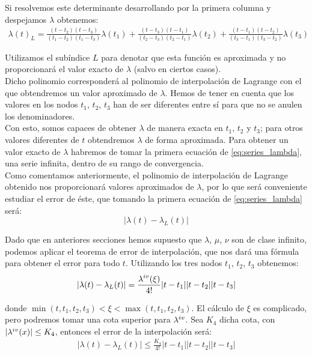 \documentclass[11pt]{book}
\newcommand\ddfrac[2]{\frac{\displaystyle #1}{\displaystyle #2}}
\begin{document}
Si resolvemos este determinante desarrollando por la primera columna y despejamos $\lambda$ obtenemos:
\begin{align}
\lambda(t)_L=
\frac{(t-t_2)(t-t_3)}{(t_1-t_2)(t_1-t_3)}\lambda(t_1)
+\frac{(t-t_3)(t-t_1)}{(t_2-t_3)(t_2-t_1)}\lambda(t_2)
+\frac{(t-t_1)(t-t_2)}{(t_3-t_1)(t_3-t_2)}\lambda(t_3)
\label{eq:lambda_value}
\end{align}

Utilizamos el subíndice $L$ para denotar que esta función es aproximada y no proporcionará el valor exacto de $\lambda$ (salvo en ciertos casos).\\

Dicho polinomio corresponderá al polinomio de interpolación de Lagrange con el que obtendremos un valor aproximado de $\lambda$. Hemos de tener en cuenta que los valores en los nodos $t_1$, $t_2$, $t_3$ han de ser diferentes entre sí para que no se anulen los denominadores.\\

Con esto, somos capaces de obtener $\lambda$ de manera exacta en $t_1$, $t_2$ y $t_3$; para otros valores diferentes de $t$ obtendremos $\lambda$ de forma aproximada. Para obtener un valor exacto de $\lambda$ habremos de tomar la primera ecuación de \eqref{eq:series_lambda}, una serie infinita, dentro de su rango de convergencia.\\

Como comentamos anteriormente, el polinomio de interpolación de Lagrange obtenido nos proporcionará valores aproximados de $\lambda$, por lo que será conveniente estudiar el error de éste, que tomando la primera ecuación de \eqref{eq:series_lambda} será:
\[
|\lambda(t)-\lambda_L(t)|
\]

Dado que en anteriores secciones hemos supuesto que $\lambda$, $\mu$, $\nu$ son de clase infinito, podemos aplicar el teorema de error de interpolación, que nos dará una fórmula para obtener el error para todo $t$. Utilizando los tres nodos $t_1$, $t_2$, $t_3$ obtenemos:
\begin{align}
|\lambda(t)-\lambda_L(t)|=\ddfrac{\lambda^{\romannumeral 4}(\xi)}{4!}|t-t_1||t-t_2||t-t_3|
\label{eq:interpolation_error}
\end{align}

\noindent donde $\min{(t,t_1,t_2,t_3)}<\xi<\max{(t,t_1,t_2,t_3)}$. El cálculo de $\xi$ es complicado, pero podremos tomar una cota superior para $\lambda^{\romannumeral 4}$. Sea $K_4$ dicha cota, con $|\lambda^{\romannumeral 4}(x)|\leq K_4$, entonces el error de la interpolación será:
\begin{align}
|\lambda(t)-\lambda_L(t)|\leq\ddfrac{K_4}{4!}|t-t_1||t-t_2||t-t_3|
\label{eq:interpolation_error_cota}
\end{align}
\end{document}
